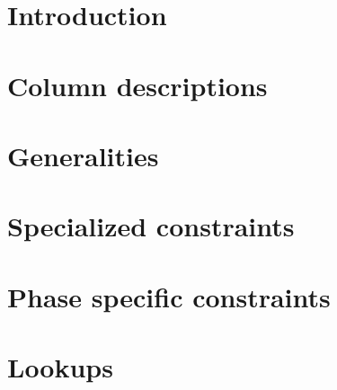 


\section{Introduction}                   \label{rlptxn: intro}                           
\section{Column descriptions}            \label{rlptxn: column descriptions}             
\section{Generalities}                   \label{rlptxn: generalities}                    
\section{Specialized constraints}        \label{rlptxn: specialized}                     
\section{Phase specific constraints}     \label{rlptxn: phase specific constraints}      
\section{Lookups}                        \label{rlptxn: lookups}                         
